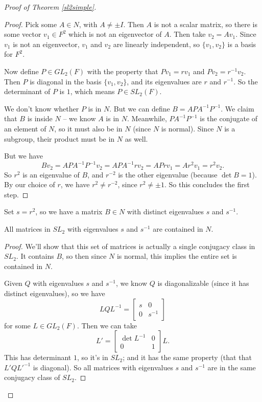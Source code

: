 \begin{proof}[Proof of Theorem \ref{sl2simple}]
    \begin{proof}
        Pick some $A \in N$, with $A \neq \pm I$. Then $A$ is not a scalar matrix, so there is some vector $v_1 \in F^2$ which is not an eigenvector of $A$. Then take $v_2 = Av_1$. Since $v_1$ is not an eigenvector, $v_1$ and $v_2$ are linearly independent, so $\{v_1, v_2\}$ is a basis for $F^2$. 
    
        Now define $P \in GL_2(F)$ with the property that $Pv_1 = rv_1$ and $Pv_2 = r^{-1}v_2$. Then $P$ is diagonal in the basis $\{v_1, v_2\}$, and its eigenvalues are $r$ and $r^{-1}$. So the determinant of $P$ is $1$, which means $P \in SL_2(F)$. 
    
        We don't know whether $P$ is in $N$. But we can define $B = APA^{-1}P^{-1}$. We claim that $B$ is inside $N$ -- we know $A$ is in $N$. Meanwhile, $PA^{-1}P^{-1}$ is the conjugate of an element of $N$, so it must also be in $N$ (since $N$ is normal). Since $N$ is a subgroup, their product must be in $N$ as well. 
    
        But we have \[Bv_2 = APA^{-1}P^{-1}v_2 = APA^{-1}rv_2 = APrv_1 = Ar^2v_1 = r^2v_2.\] So $r^2$ is an eigenvalue of $B$, and $r^{-2}$ is the other eigenvalue (because $\det B = 1$). By our choice of $r$, we have $r^2 \neq r^{-2}$, since $r^2 \neq \pm 1$. So this concludes the first step. 
    \end{proof}
    
    Set $s = r^2$, so we have a matrix $B \in N$ with distinct eigenvalues $s$ and $s^{-1}$.
    
    \begin{claim}
        All matrices in $SL_2$ with eigenvalues $s$ and $s^{-1}$ are contained in $N$. 
    \end{claim}
    
    \begin{proof}
        We'll show that this set of matrices is actually a single conjugacy class in $SL_2$. It contains $B$, so then since $N$ is normal, this implies the entire set is contained in $N$. 
    
        Given $Q$ with eigenvalues $s$ and $s^{-1}$, we know $Q$ is diagonalizable (since it has distinct eigenvalues), so we have \[LQL^{-1} = \begin{bmatrix} s & 0 \\ 0 & s^{-1}\end{bmatrix}\] for some $L \in GL_2(F)$. Then we can take \[L' = \begin{bmatrix} \det L^{-1} & 0 \\ 0 & 1 \end{bmatrix} L.\] This has determinant $1$, so it's in $SL_2$; and it has the same property (that that $L'QL'^{-1}$ is diagonal). So all matrices with eigenvalues $s$ and $s^{-1}$ are in the same conjugacy class of $SL_2$. 
    \end{proof}


\end{proof}
